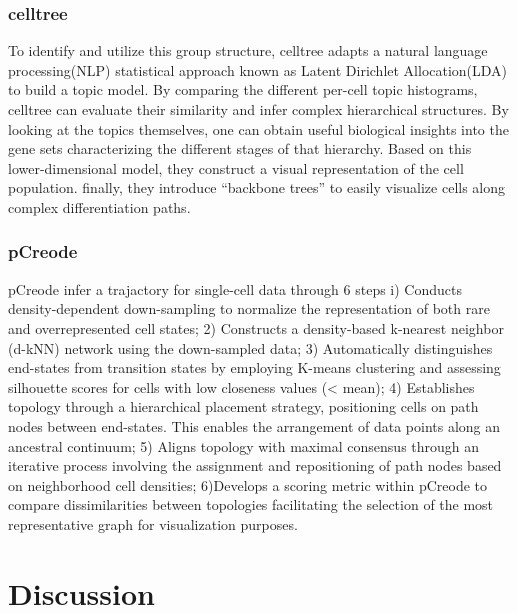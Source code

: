 \subsubsection{celltree} To identify and utilize this group structure, celltree adapts a natural language processing(NLP) statistical approach known as Latent Dirichlet Allocation(LDA) to build a topic model. By comparing the different per-cell topic histograms, celltree can evaluate their similarity and infer complex hierarchical structures. By looking at the topics themselves, one can obtain useful biological insights into the gene sets characterizing the different stages of that hierarchy. Based on this lower-dimensional model, they construct a visual representation of the cell population. finally, they introduce “backbone trees” to easily visualize cells along complex differentiation paths.
\subsubsection{pCreode} pCreode infer a trajactory for single-cell data through 6 steps i) Conducts density-dependent down-sampling to normalize the representation of both rare and overrepresented cell states; 2) Constructs a density-based k-nearest neighbor (d-kNN) network using the down-sampled data; 3) Automatically distinguishes end-states from transition states by employing K-means clustering and assessing silhouette scores for cells with low closeness values (< mean); 4) Establishes topology through a hierarchical placement strategy, positioning cells on path nodes between end-states. This enables the arrangement of data points along an ancestral continuum; 5) Aligns topology with maximal consensus through an iterative process involving the assignment and repositioning of path nodes based on neighborhood cell densities; 6)Develops a scoring metric within pCreode to compare dissimilarities between topologies facilitating the selection of the most representative graph for visualization purposes.


\section{Discussion}
